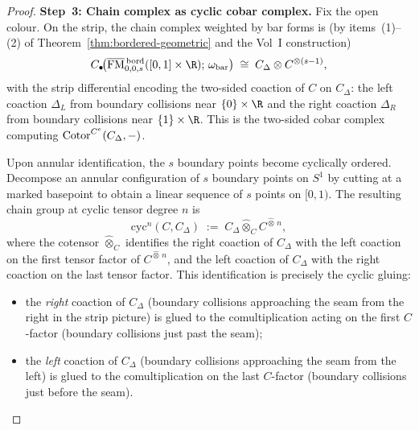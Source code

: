 \begin{proof}
\medskip\noindent
\textbf{Step~3: Chain complex as cyclic cobar complex.}
Fix the open colour. On the strip, the chain complex weighted by
bar forms is (by items~(1)--(2) of
Theorem~\ref{thm:bordered-geometric} and the Vol~I construction)
\[
C_\bullet\!\bigl(
\overline{\FM}{}^{\,\mathrm{bord}}_{0,0,s}([0,1]\times\R);\,
\omega_{\mathrm{bar}}
\bigr)
\;\cong\;
C_\Delta \otimes C^{\otimes (s-1)},
\]
with the strip differential encoding the two-sided coaction of $C$
on $C_\Delta$: the left coaction $\Delta_L$ from boundary collisions
near $\{0\}\times\R$ and the right coaction $\Delta_R$ from boundary
collisions near $\{1\}\times\R$. This is the two-sided cobar
complex computing $\operatorname{Cotor}^{C^e}(C_\Delta, -)$.

Upon annular identification, the $s$ boundary points become
cyclically ordered. Decompose an annular configuration of $s$
boundary points on $S^1$ by cutting at a marked basepoint to
obtain a linear sequence of $s$ points on $[0,1)$. The resulting
chain group at cyclic tensor degree $n$ is
\[
\mathrm{cyc}^n(C, C_\Delta)
\;:=\;
C_\Delta \widehat\otimes_{C} C^{\widehat\otimes\, n},
\]
where the cotensor $\widehat\otimes_C$ identifies the right coaction
of $C_\Delta$ with the left coaction on the first tensor factor of
$C^{\widehat\otimes\, n}$, and the left coaction of $C_\Delta$ with
the right coaction on the last tensor factor. This
identification is precisely the cyclic gluing:
\begin{itemize}
\item the \emph{right} coaction of $C_\Delta$ (boundary collisions
 approaching the seam from the right in the strip picture) is
 glued to the comultiplication acting on the first $C$-factor
 (boundary collisions just past the seam);
\item the \emph{left} coaction of $C_\Delta$ (boundary collisions
 approaching the seam from the left) is glued to the
 comultiplication on the last $C$-factor (boundary collisions
 just before the seam).
\end{itemize}


\end{proof}
